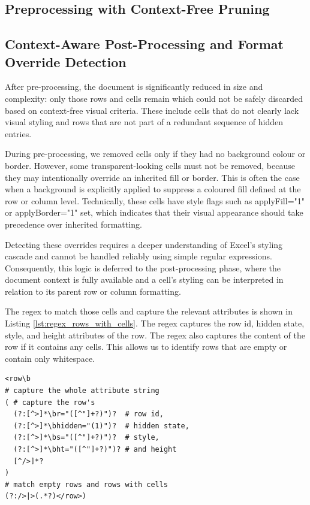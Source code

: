 

\subsection{Preprocessing with Context-Free Pruning}

  




\subsection{Context-Aware Post-Processing and Format Override Detection}


After pre-processing, the document is significantly reduced in size and complexity:
only those rows and cells remain which could not be safely discarded
based on context-free visual criteria.
These include cells that do not clearly lack visual styling
and rows that are not part of a redundant sequence of hidden entries.

 
 During pre-processing, we removed cells only if they had no background colour or border.
 However, some transparent-looking cells must not be removed,
 because they may intentionally override an inherited fill or border.
 This is often the case when a background is explicitly applied
 to suppress a coloured fill defined at the row or column level.
 Technically, these cells have style flags such as applyFill="1"
 or applyBorder="1" set, which indicates that their visual appearance
 should take precedence over inherited formatting.

Detecting these overrides requires a deeper understanding of Excel's styling cascade
and cannot be handled reliably using simple regular expressions.
Consequently, this logic is deferred to the post-processing phase,
where the document context is fully available
and a cell's styling can be interpreted in relation
to its parent row or column formatting.

The regex to match those cells and capture the relevant attributes
is shown in Listing \ref{lst:regex_rows_with_cells}.
The regex captures the row id, hidden state, style, and height attributes of the row.
The regex also captures the content of the row if it contains any cells.
This allows us to identify rows that are empty or contain only whitespace.

\begin{lstlisting}[caption={Regex for rows in cell range},label={lst:regex_rows_with_cells}]
<row\b
# capture the whole attribute string
( # capture the row's
  (?:[^>]*\br="([^"]+?)")?  # row id,
  (?:[^>]*\bhidden="(1)")?  # hidden state,
  (?:[^>]*\bs="([^"]+?)")?  # style,
  (?:[^>]*\bht="([^"]+?)")? # and height
  [^/>]*?
)
# match empty rows and rows with cells
(?:/>|>(.*?)</row>)
\end{lstlisting}


